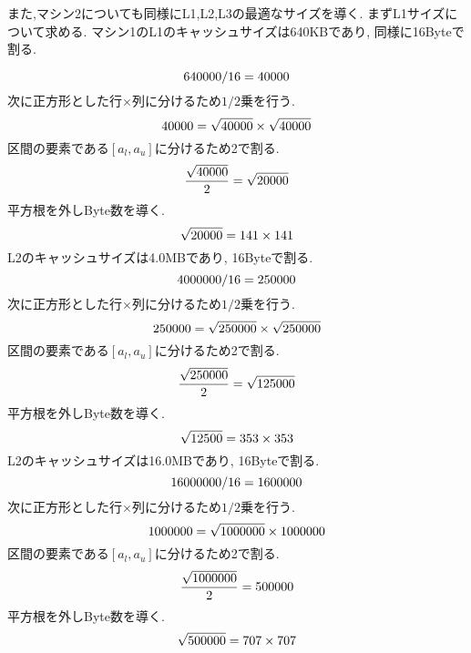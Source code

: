 \documentclass[11pt,a4paper]{jsreport}
\theoremstyle{definition}
\begin{document}
また,マシン2についても同様にL1,L2,L3の最適なサイズを導く. まずL1サイズについて求める. マシン1のL1のキャッシュサイズは640KBであり, 同様に16Byteで割る.

\begin{equation}
640000 / 16 = 40000 \\
\end{equation}
次に正方形とした行$\times$列に分けるため$1/2$乗を行う.
\begin{equation}
40000 = \sqrt{40000} \times \sqrt{40000} \\
\end{equation}
区間の要素である$[a_l,a_u]$に分けるため2で割る.
\begin{equation}
\frac{\sqrt{40000}}{2} = \sqrt{20000} \\
\end{equation}
平方根を外しByte数を導く.
\begin{equation}
\sqrt{20000} = 141 \times 141 \\
\end{equation}
L2のキャッシュサイズは4.0MBであり, 16Byteで割る.
\begin{equation}
4000000 / 16 = 250000 \\
\end{equation}
次に正方形とした行$\times$列に分けるため$1/2$乗を行う.
\begin{equation}
250000 = \sqrt{250000} \times \sqrt{250000} \\
\end{equation}
区間の要素である$[a_l,a_u]$に分けるため2で割る.
\begin{equation}
\frac{\sqrt{250000}}{2} = \sqrt{125000} \\
\end{equation}
平方根を外しByte数を導く.
\begin{equation}
\sqrt{12500} = 353 \times 353 \\
\end{equation}
L2のキャッシュサイズは16.0MBであり, 16Byteで割る.
\begin{equation}
16000000 /16 = 1600000 \\
\end{equation}
次に正方形とした行$\times$列に分けるため$1/2$乗を行う.
\begin{equation}
1000000 = \sqrt{1000000} \times {1000000} \\
\end{equation}
区間の要素である$[a_l,a_u]$に分けるため2で割る.
\begin{equation}
\frac{\sqrt{1000000}}{2} = {500000} \\
\end{equation}
平方根を外しByte数を導く.
\begin{equation}
\sqrt{500000} = 707 \times 707 \\
\end{equation}
\end{document}
